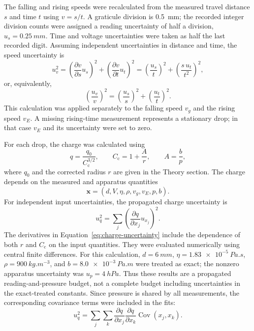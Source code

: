 \documentclass[12pt,a4paper]{article}
\begin{document}
The falling and rising speeds were recalculated from the measured travel
distance $s$ and time $t$ using $v=s/t$. A graticule division is
\SI{0.5}{mm}; the recorded integer division counts were assigned a reading
uncertainty of half a division, $u_s=\SI{0.25}{mm}$. Time and voltage
uncertainties were taken as half the last recorded digit. Assuming independent
uncertainties in distance and time, the speed uncertainty is
\begin{equation}
    u_v^2 =
    \left(\frac{\partial v}{\partial s}u_s\right)^2
    +\left(\frac{\partial v}{\partial t}u_t\right)^2
    =
    \left(\frac{u_s}{t}\right)^2
    +\left(\frac{s\,u_t}{t^2}\right)^2,
\end{equation}
or, equivalently,
\begin{equation}
    \left(\frac{u_v}{v}\right)^2 =
    \left(\frac{u_s}{s}\right)^2
    +\left(\frac{u_t}{t}\right)^2.
\end{equation}
This calculation was applied separately to the falling speed $v_g$ and the
rising speed $v_E$. A missing rising-time measurement represents a stationary
drop; in that case $v_E$ and its uncertainty were set to zero.

For each drop, the charge was calculated using
\begin{equation}
    q = \frac{q_0}{C_{\mathrm{c}}^{3/2}},
    \qquad
    C_{\mathrm{c}} = 1+\frac{A}{r},
    \qquad
    A=\frac{b}{p},
\end{equation}
where $q_0$ and the corrected radius $r$ are given in the Theory section.
The charge depends on the measured and apparatus quantities
\begin{equation}
    \boldsymbol{x} =
    (d,V,\eta,\rho,v_g,v_E,p,b).
\end{equation}
For independent input uncertainties, the propagated charge uncertainty is
\begin{equation}
    u_q^2 =
    \sum_j
    \left(
        \frac{\partial q}{\partial x_j}u_{x_j}
    \right)^2.
    \label{eq:charge-uncertainty}
\end{equation}
The derivatives in Equation~\ref{eq:charge-uncertainty} include the
dependence of both $r$ and $C_{\mathrm{c}}$ on the input quantities. They
were evaluated numerically using central finite differences. For this
calculation, $d=\SI{6}{mm}$, $\eta=\SI{1.83e-5}{Pa.s}$,
$\rho=\SI{900}{kg.m^{-3}}$, and $b=\SI{8.0e-3}{Pa.m}$ were treated as exact;
the nonzero apparatus uncertainty was $u_p=\SI{4}{hPa}$. Thus these results
are a propagated reading-and-pressure budget, not a complete budget including
uncertainties in the exact-treated constants. Since pressure is shared by all
measurements, the corresponding covariance terms were included in the fits:
\begin{equation}
    u_q^2 =
    \sum_j\sum_k
    \frac{\partial q}{\partial x_j}
    \frac{\partial q}{\partial x_k}
    \operatorname{Cov}(x_j,x_k).
\end{equation}
\end{document}
